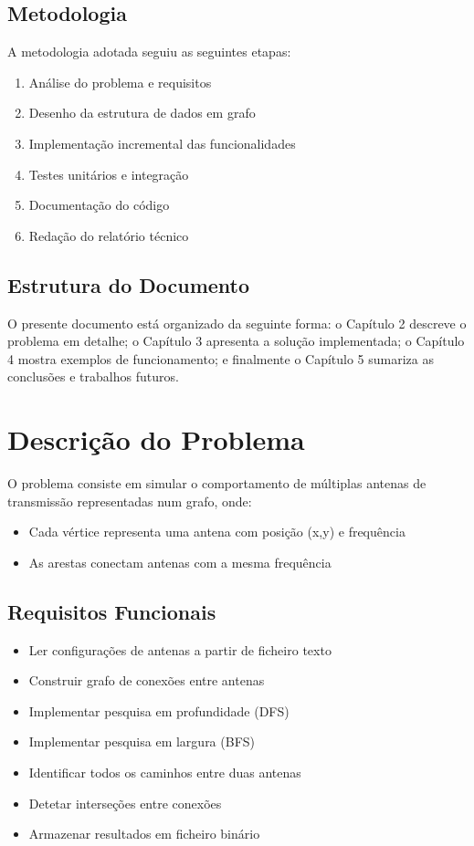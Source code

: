 \documentclass[a4paper, 12pt]{report}
\begin{document}
\newpage 

\section{Metodologia}
A metodologia adotada seguiu as seguintes etapas:
\begin{enumerate}
\item Análise do problema e requisitos
\item Desenho da estrutura de dados em grafo
\item Implementação incremental das funcionalidades
\item Testes unitários e integração
\item Documentação do código
\item Redação do relatório técnico
\end{enumerate}

\section{Estrutura do Documento}
O presente documento está organizado da seguinte forma: o Capítulo 2 descreve o problema em detalhe; o Capítulo 3 apresenta a solução implementada; o Capítulo 4 mostra exemplos de funcionamento; e finalmente o Capítulo 5 sumariza as conclusões e trabalhos futuros.

\chapter{Descrição do Problema}
O problema consiste em simular o comportamento de múltiplas antenas de transmissão representadas num grafo, onde:
\begin{itemize}
\item Cada vértice representa uma antena com posição (x,y) e frequência
\item As arestas conectam antenas com a mesma frequência
\end{itemize}

\section{Requisitos Funcionais}
\begin{itemize}
\item Ler configurações de antenas a partir de ficheiro texto
\item Construir grafo de conexões entre antenas
\item Implementar pesquisa em profundidade (DFS)
\item Implementar pesquisa em largura (BFS)
\item Identificar todos os caminhos entre duas antenas
\item Detetar interseções entre conexões
\item Armazenar resultados em ficheiro binário
\end{itemize}
\end{document}
